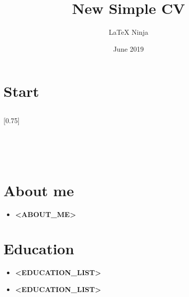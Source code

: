 \documentclass[lighthipster]{simplehipstercv}
\title{New Simple CV}
\author{\LaTeX{} Ninja}
\date{June 2019}
\begin{document}
    \thispagestyle{empty}

    \section*{Start}


    \subsection*{}
    \vspace{4em}

    \setlength{\columnsep}{1.5cm}
    [0.75]
    \begin{paracol}{2}

        \footnotesize
        {\setasidefontcolour
        \flushright
            \begin{center}
            \end{center}


             \\[0.5em]
            \bigskip
             \\[0.5em]
            \bigskip
             \\[0.5em]
            \bigskip

        }

        \switchcolumn

        \small
        \section*{About me}
        \begin{itemize}
            \item \textbf{<ABOUT_ME>}
        \end{itemize}

        \vspace{3em}

        \section*{Education}
        \begin{itemize}
            \item \textbf{<EDUCATION_LIST>}
            \item \textbf{<EDUCATION_LIST>}
        \end{itemize}


\end{paracol}
\end{document}
